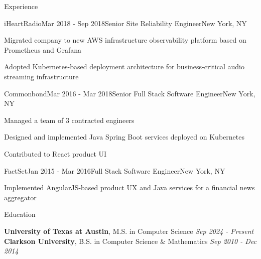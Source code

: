 \documentclass[
	10pt, %
]{resume} %
\begin{document}
\begin{rSection}{Experience}

    \begin{rSubsection}{iHeartRadio}{Mar 2018 - Sep 2018}{Senior Site Reliability Engineer}{New York, NY}
        \item Migrated company to new AWS infrastructure observability platform based on Prometheus and Grafana
        \item Adopted Kubernetes-based deployment architecture for business-critical audio streaming infrastructure
    \end{rSubsection}


    \begin{rSubsection}{Commonbond}{Mar 2016 - Mar 2018}{Senior Full Stack Software Engineer}{New York, NY}
        \item Managed a team of 3 contracted engineers
        \item Designed and implemented Java Spring Boot services deployed on Kubernetes
        \item Contributed to React product UI
    \end{rSubsection}
    

    \begin{rSubsection}{FactSet}{Jan 2015 - Mar 2016}{Full Stack Software Engineer}{New York, NY}
        \item Implemented AngularJS-based product UX and Java services for a financial news aggregator
    \end{rSubsection}

\end{rSection}


\begin{rSection}{Education}

    \textbf{University of Texas at Austin}, M.S. in Computer Science \hfill \textit{Sep 2024 - Present} \\ 

    \textbf{Clarkson University}, B.S. in Computer Science \& Mathematics \hfill \textit{Sep 2010 - Dec 2014} \\
	
\end{rSection}
\end{document}
